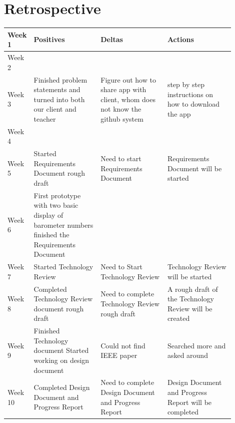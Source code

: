 \documentclass[onecolumn, draftclsnofoot,10pt, compsoc]{IEEEtran}
\begin{document}
\section{Retrospective}
\begin{center}
	\begin{tabular}{| l | p{0.3\linewidth} | p{0.3\linewidth} | p{0.3\linewidth} |}
		\hline
		Week 1 & Positives & Deltas & Actions \\ \hline
		Week 2 & & & \\ \hline				%
		Week 3 & Finished problem statements and turned into both our client and teacher
 & Figure out how to share app with client, whom does not know the github system
 & step by step instructions on how to download the app \\ \hline
		Week 4 & & & \\ \hline
    Week 5 & Started Requirements Document rough draft & Need to start Requirements Document & Requirements Document will be started \\ \hline
		Week 6 & First prototype with two basic display of barometer numbers
  finished the Requirements Document & & \\ \hline
		Week 7 & Started Technology Review & Need to Start Technology Review & Technology Review will be started \\ \hline
		Week 8 & Completed Technology Review document rough draft & Need to complete Technology Review rough draft & A rough draft of the Technology Review will be created \\ \hline
		Week 9 &Finished Technology document
Started working on design document
 & Could not find IEEE paper & Searched more and asked around\\ \hline
		Week 10 & Completed Design Document and Progress Report & Need to complete Design Document and Progress Report & Design Document and Progress Report will be completed \\ \hline





	\end{tabular}
\end{center}
\end{document}

